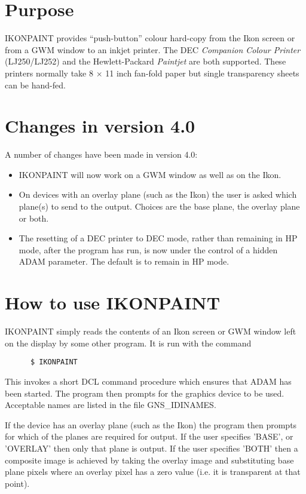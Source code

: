 \section{Purpose}

IKONPAINT provides ``push-button'' colour hard-copy from the Ikon screen
or from a GWM window to an inkjet printer.
The DEC {\it Companion Colour Printer} (LJ250/LJ252) and the Hewlett-Packard
{\it Paintjet} are both supported.
These printers normally take 8 $\times$ 11 inch fan-fold paper but
single transparency sheets can be hand-fed.

\section{Changes in version 4.0}
A number of changes have been made in version 4.0:
\begin{itemize}
\item IKONPAINT will now work on a GWM window as well as on the Ikon.
\item On devices with an overlay plane (such as the Ikon) the user is
asked which plane(s) to send to the output. Choices are the base plane,
the overlay plane or both.
\item The resetting of a DEC printer to DEC mode, rather than remaining
in HP mode, after the program has run, is now under the control of a
hidden ADAM parameter. The default is to remain in HP mode.
\end{itemize}

\section{How to use IKONPAINT}

IKONPAINT simply reads the contents of an Ikon screen or GWM window
left on the display by some other program. It is run with the command
\begin{verbatim}
      $ IKONPAINT
\end{verbatim}
This invokes a short DCL command procedure which ensures that ADAM has
been started. The program then prompts for the graphics device to be
used. Acceptable names are listed in the file GNS\_IDINAMES.

If the device has an overlay plane (such as the Ikon) the program then
prompts for which of the planes are required for output. If the user
specifies 'BASE', or 'OVERLAY' then only that plane is output. If the
user specifies 'BOTH' then a composite image is achieved by
taking the overlay image and substituting base plane pixels where an
overlay pixel has a zero value (i.e. it is transparent at that point).

